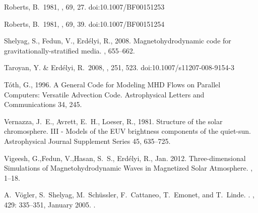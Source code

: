 \documentclass[linenumbers]{aastex63}
\begin{document}
\begin{thebibliography}{}
 Roberts, B.\ 1981, \solphys, 69, 27. doi:10.1007/BF00151253

 Roberts, B.\ 1981, \solphys, 69, 39. doi:10.1007/BF00151254

{Shelyag}, S., {Fedun}, V., {Erd{\'e}lyi}, R., 2008. {Magnetohydrodynamic code
  for gravitationally-stratified media}. , 655--662.

 Taroyan, Y. \& Erd{\'e}lyi, R.\ 2008, \solphys, 251, 523. doi:10.1007/s11207-008-9154-3



{T{\'o}th}, G., 1996. {A General Code for Modeling {MHD} Flows on Parallel
  Computers: Versatile Advection Code}. Astrophysical Letters and
  Communications 34, 245.

{Vernazza}, J.~E., {Avrett}, E.~H., {Loeser}, R., 1981. {Structure of the solar
  chromosphere. III - Models of the EUV brightness components of the
  quiet-sun}. Astrophysical Journal Supplement Series 45, 635--725.

{Vigeesh}, G.,{Fedun}, V.,{Hasan}, S.~S., {Erd{\'e}lyi}, R.,  Jan. 2012. {Three-dimensional Simulations of Magnetohydrodynamic Waves in Magnetized Solar Atmosphere}. , 1--18.



A.~{V{\"o}gler}, S.~{Shelyag}, M.~{Sch{\"u}ssler}, F.~{Cattaneo}, T.~{Emonet},
  and T.~{Linde}.
.
\newblock \emph{\aap}, 429: 335--351, January 2005.
\newblock {}.






\end{thebibliography}
\end{document}
